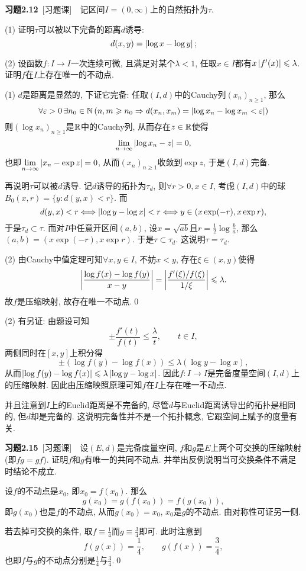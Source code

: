 	\textbf{习题2.12}\ [习题课]\ \ 记区间$ I=(0,\infty) $上的自然拓扑为$ \tau $.
	
	(1) 证明$ \tau $可以被以下完备的距离$ d $诱导:
	\[
	d(x,y)=\left| \log x-\log y \right| ;
	\]
	
	(2) 设函数$ f : I\to I $一次连续可微, 且满足对某个$ \lambda<1 $, 任取$ x\in I $都有$ x\left| f'(x) \right| \leqslant\lambda $. 证明$ f $在$ I $上存在唯一的不动点.
	\begin{Proof}
	(1) $ d $是距离是显然的, 下证它完备: 任取$ (I,d) $中的Cauchy列$ (x_n)_{n\geqslant 1} $, 那么
	\[
	\forall\varepsilon>0\,\exists n_0\in\mathbb{N}\,(n,m\geqslant n_0\Rightarrow d(x_n,x_m)=\left| \log{x_n}-\log{x_m}<\varepsilon \right| )
	\]
	则$ (\log x_n)_{n\geqslant 1} $是$ \mathbb{R} $中的Cauchy列, 从而存在$ z\in\mathbb{R} $使得
	\[
	\lim_{n\to\infty}\left| \log x_n-z \right| =0,
	\]
	也即$ \lim\limits_{n\to\infty}\left| x_n-\exp z \right| =0 $, 从而$ (x_n)_{n\geqslant 1} $收敛到$ \exp z $, 于是$ (I,d) $完备.
	
	再说明$ \tau $可以被$ d $诱导. 记$ d $诱导的拓扑为$ \tau_d $, 则$ \forall r>0,x\in I $, 考虑$ (I,d) $中的球$ B_0(x,r)=\{ y : d(y,x)<r \} $. 而
	\[
	d(y,x)<r\Longleftrightarrow\left| \log y-\log x \right| <r\Longleftrightarrow y\in(x\exp (-r),x\exp r),
	\]
	于是$ \tau_d\subset \tau $. 而对$ I $中任意开区间$ (a,b) $, 设$ x=\sqrt{ab} $且$ r=\frac{1}{2}\log\frac{b}{a} $, 那么$ (a,b)=(x\exp(-r),x\exp r) $. 于是$ \tau\subset\tau_d $. 这说明$ \tau=\tau_d $.
	
	(2) 由Cauchy中值定理可知$ \forall x,y\in I $, 不妨$ x<y $, 存在$ \xi\in(x,y) $使得
	\[
	\left| \frac{\log f(x)-\log f(y)}{x-y} \right| =\left| \frac{f'(\xi)/f(\xi)}{1/\xi} \right| \leqslant\lambda.
	\]
	故$ f $是压缩映射, 故存在唯一不动点.\qed
	\end{Proof}
	\begin{Remark}
	(2) 有另证: 由题设可知
	\[
	\pm\frac{f'(t)}{f(t)}\leqslant\frac{\lambda}{t},\qquad t\in I,
	\]
	两侧同时在$ [x,y] $上积分得
	\[
	\pm(\log f(y)-\log f(x))\leqslant\lambda(\log y-\log x),
	\]
	从而$ \left| \log f(y)-\log f(x) \right| \leqslant\lambda\left| \log y-\log x \right|  $. 因此$ f : I\to I $是完备度量空间$ (I,d) $上的压缩映射. 因此由压缩映照原理可知$ f $在$ I $上存在唯一不动点.
	
	并且注意到$ I $上的Euclid距离是不完备的, 尽管$ d $与Euclid距离诱导出的拓扑是相同的, 但$ d $却是完备的. 这说明完备性并不是一个拓扑概念, 它跟空间上赋予的度量有关.
	\end{Remark}
	
	\textbf{习题2.15}\ [习题课]\ \ 设$ (E,d) $是完备度量空间, $ f $和$ g $是$ E $上两个可交换的压缩映射(即$ fg=gf $). 证明$ f $和$ g $有唯一的共同不动点. 并举出反例说明当可交换条件不满足时结论不成立.
	\begin{Proof}
	设$ f $的不动点是$ x_0 $, 即$ x_0=f(x_0) $. 那么
	\[
	g(x_0)=g(f(x_0))=f(g(x_0)),
	\]
	即$ g(x_0) $也是$ f $的不动点, 从而$ g(x_0)=x_0 $, $ x_0 $是$ g $的不动点. 由对称性可证另一侧.
	
	若去掉可交换的条件, 取$ f\equiv\frac{1}{4} $而$ g\equiv\frac{3}{4} $即可. 此时注意到
	\[
	f(g(x))=\frac{1}{4},\qquad g(f(x))=\frac{3}{4},
	\]
	也即$ f $与$ g $的不动点分别是$ \frac{1}{4} $与$ \frac{3}{4} $.\qed
	\end{Proof}
	
